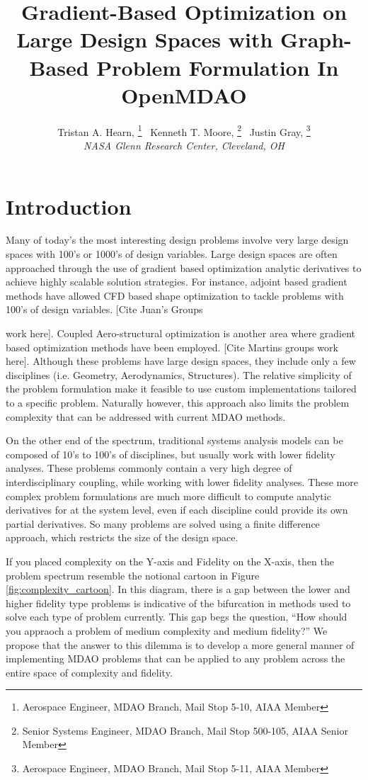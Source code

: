 \documentclass[]{aiaa-tc} %
\title{Gradient-Based Optimization on Large Design Spaces with Graph-Based Problem Formulation In OpenMDAO}
\author{
  Tristan A. Hearn,%
     \thanks{Aerospace Engineer, MDAO Branch, Mail Stop 5-10, AIAA Member}
  \ Kenneth T. Moore,%
     \thanks{Senior Systems Engineer, MDAO Branch, Mail Stop 500-105, AIAA Senior Member}
  \ Justin Gray,%
     \thanks{Aerospace Engineer, MDAO Branch, Mail Stop 5-11, AIAA Member}
   \\
  {\normalsize\itshape
  NASA Glenn Research Center, Cleveland, OH}  \\
 }
\begin{document}
  \maketitle

  \begin{abstract}

  \end{abstract}

  \section{Introduction}

    Many of today's the most interesting design problems involve very large design spaces with 100's or 1000's of
    design variables. Large design spaces are often approached through the use of gradient based optimization
    analytic derivatives to achieve highly scalable solution strategies. For instance, adjoint based gradient
    methods have allowed CFD based shape optimization to tackle problems with 100's of design variables. [Cite Juan's Groups

    work here]. Coupled Aero-structural optimization is another area where gradient based optimization methods have
    been employed. [Cite Martins groups work here]. Although these problems have large design spaces,
    they include only a few disciplines (i.e. Geometry, Aerodynamics, Structures). The relative simplicity of
    the problem formulation make it feasible to use custom implementations tailored to a specific problem. Naturally however,
    this approach also limits the problem complexity that can be addressed with current MDAO methods.

    On the other end of the spectrum, traditional systems analysis models can be composed of 10's to 100's of disciplines,
    but usually work with lower fidelity analyses. These problems commonly contain a very high degree of interdisciplinary
    coupling, while working with lower fidelity analyses. These more complex problem formulations are much more difficult to compute
    analytic derivatives for at the system level, even if each discipline could provide its own partial derivatives. So many
    problems are solved using a finite difference approach, which restricts the size of the design space.

    If you placed complexity on the Y-axis and Fidelity on the X-axis, then the problem spectrum resemble the notional
    cartoon in Figure \ref{fig:complexity_cartoon}. In this diagram, there is a gap between the lower and higher fidelity
    type problems is indicative of the bifurcation in methods used to solve each type of problem currently. This gap begs the
    question, ``How should you appraoch a problem of medium complexity and medium fidelity?'' We propose that the answer to this
    dilemma is to develop a more general manner of implementing MDAO problems that can be applied to any problem across the entire
    space of complexity and fidelity.
\end{document}
